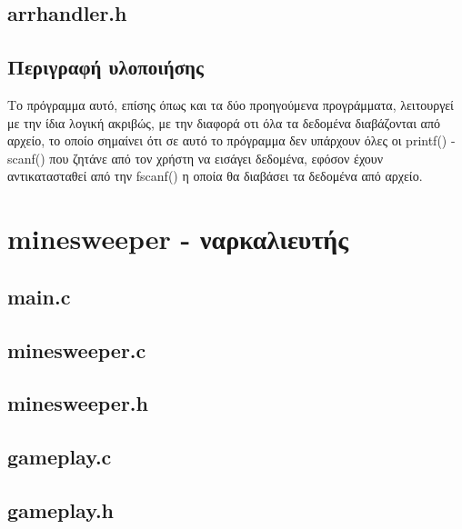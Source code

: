 \documentclass{article}
\begin{document}
    \subsection{arrhandler.h}
         

    \subsection{Περιγραφή υλοποιήσης}

    Το πρόγραμμα αυτό, επίσης όπως και τα δύο προηγούμενα προγράμματα, λειτουργεί με την ίδια λογική
    ακριβώς, με την διαφορά οτι όλα τα δεδομένα διαβάζονται από αρχείο, το οποίο σημαίνει ότι σε αυτό το
    πρόγραμμα δεν υπάρχουν όλες οι printf() - scanf() που ζητάνε από τον χρήστη να εισάγει δεδομένα, εφόσον έχουν
    αντικατασταθεί από την fscanf() η οποία θα διαβάσει τα δεδομένα από αρχείο. 

\section{minesweeper - ναρκαλιευτής}

    \subsection{main.c}
        

    \subsection{minesweeper.c}
        

    \subsection{minesweeper.h}
        

    \subsection{gameplay.c}
        

    \subsection{gameplay.h}
        
\end{document}

